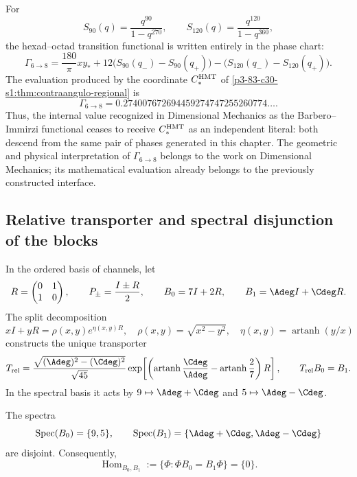 For
\[
S_{90}(q)=\frac{q^{90}}{1-q^{270}},
\qquad
S_{120}(q)=\frac{q^{120}}{1-q^{360}},
\]
the hexad--octad transition functional is written entirely in the
phase chart:
\[
\Gamma_{6\to8}
=\frac{180}{\pi}xy_*
+12\bigl(S_{90}(q_-)-S_{90}(q_+)\bigr)
-\bigl(S_{120}(q_-)-S_{120}(q_+)\bigr).
\]
The evaluation produced by the coordinate \(C_*^{\rm HMT}\) of
\cref{p3-83-c30-s1:thm:contraangulo-regional} is
\[
\boxed{
\Gamma_{6\to8}
=0.274007672694459274747255260774\ldots.}
\]
Thus, the internal value recognized in Dimensional Mechanics as the Barbero--Immirzi functional ceases to receive \(C_*^{\rm HMT}\) as an independent literal: both descend from the same pair of phases generated in this chapter. The geometric and physical interpretation of \(\Gamma_{6\to8}\) belongs to the work on Dimensional Mechanics; its mathematical evaluation already belongs to the previously constructed interface.

\subsection{Relative transporter and spectral disjunction of the blocks}
\label{sec:s102:c38:6:2}

\label{p3-83-c30-s1:sec:transportador-relativo-split}

In the ordered basis of channels, let
\[
 R=\begin{pmatrix}0&1\\1&0\end{pmatrix},
 \qquad P_\pm=\frac{I\pm R}{2},
 \qquad
 B_0=7I+2R,
 \qquad B_1=\Adeg I+\Cdeg R.
\]
The split decomposition
\[
 xI+yR=\rho(x,y)e^{\eta(x,y)R},
 \quad \rho(x,y)=\sqrt{x^2-y^2},
 \quad \eta(x,y)=\operatorname{artanh}(y/x)
\]
constructs the unique transporter
\[
 T_{\rm rel}
 =\frac{\sqrt{(\Adeg)^2-(\Cdeg)^2}}{\sqrt{45}}
   \exp\!\left[
   \left(\operatorname{artanh}\frac{\Cdeg}{\Adeg}
   -\operatorname{artanh}\frac27\right)R\right],
 \qquad T_{\rm rel}B_0=B_1.
\]
In the spectral basis it acts by
\(9\mapsto\Adeg+\Cdeg\) and
\(5\mapsto\Adeg-\Cdeg\).

\begin{theorem}
\label{p3-83-c30-s1:thm:no-go-entrelazador-bloques-split}
The spectra
\[
 \operatorname{Spec}(B_0)=\{9,5\},\qquad
 \operatorname{Spec}(B_1)=\{\Adeg+\Cdeg,\Adeg-\Cdeg\}
\]
are disjoint. Consequently,
\[
 \operatorname{Hom}_{B_0,B_1}
 :=\{\Phi:\Phi B_0=B_1\Phi\}=\{0\}.
\]
\end{theorem}


